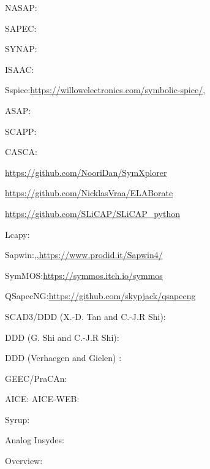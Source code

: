 \documentclass{article}[11pt]
\begin{document}
\notetitle

NASAP:\cite{moe-nasap-69,bach-nasap-69}

SAPEC:\cite{liberatore-sapec-88}

SYNAP:\cite{seda-symana-88,seda-symana-92}

ISAAC:\cite{gielen-isaac-89,sansen-isaac-89}

Sspice:\url{https://willowelectronics.com/symbolic-spice/}, \cite{wierzba-sspice-89}

ASAP:\cite{fernandez-asap-90,fernandez-asap-91}

SCAPP:\cite{hassoun-scapp-95}

CASCA:\cite{floberg-symana-97}

\url{https://github.com/NooriDan/SymXplorer}

\url{https://github.com/NicklasVraa/ELABorate}

\url{https://github.com/SLiCAP/SLiCAP_python}

Lcapy:\cite{hayes-lcapy-22}

Sapwin:\cite{luchetta-sapwin-01},\cite{grasso-sapwin-13},\url{https://www.prodid.it/Sapwin4/}

SymMOS:\url{https://symmos.itch.io/symmos}

QSapecNG:\url{https://github.com/skypjack/qsapecng}

SCAD3/DDD (X.-D. Tan and C.-J.R Shi):\cite{tan-scad3-15,shi-ddd-97,shi-canddd-00}

DDD (G. Shi and C.-J.R Shi):\cite{shi-ordereduction-06,shi-symbana-14}

DDD (Verhaegen and Gielen) :\cite{verhaegen-dddsymana-01,verhaegen-dddsymana-02}

GEEC/PraCAn:\cite{hospodka-pracan-10,paulu-geec-17}

AICE:\cite{gu-amasymgui-15}
AICE-WEB:\cite{yu-amasymweb-17}

Syrup:\cite{riel-syrup-03}

Analog Insydes:\cite{fraunhofer-anains,thomassian-anains-07}

Overview:\cite{gielen-symanaoverview-94} \cite{fernandez-symanaoverview-96} \cite{gielen-symanasum-02} \cite{fernandez-symbana-98}

\cite{filaretov-symana-20}

\printbibliography
\end{document}
